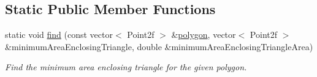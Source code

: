 \subsection*{Static Public Member Functions}
\begin{DoxyCompactItemize}
\item 
static void \hyperlink{classmultiscale_1_1MinimumAreaEnclosingTriangle_a2a116b0cb1b5b8306d2483bd5d55bd68}{find} (const vector$<$ Point2f $>$ \&\hyperlink{classmultiscale_1_1MinimumAreaEnclosingTriangle_ae00ebcf0a1f6bb966d9735a4be44a2f3}{polygon}, vector$<$ Point2f $>$ \&minimum\-Area\-Enclosing\-Triangle, double \&minimum\-Area\-Enclosing\-Triangle\-Area)
\begin{DoxyCompactList}\small\item\em Find the minimum area enclosing triangle for the given polygon. \end{DoxyCompactList}\end{DoxyCompactItemize}

